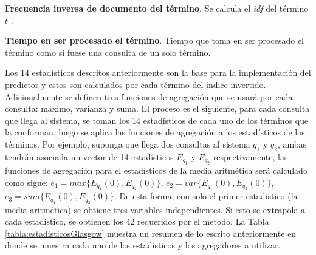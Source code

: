 \begin{list}{}{}
	\item \textbf{Frecuencia inversa de documento del término}. Se calcula el \textit{idf} del término $t$ \citep{Baeza-Yates:2011}.
	
	\item \textbf{Tiempo en ser procesado el término}. Tiempo que toma en ser procesado el término como si fuese una consulta de un solo término.

\end{list}

Los 14 estadísticos descritos anteriormente son la base para la implementación del predictor y estos son calculados por cada término del índice invertido. Adicionalmente se definen tres funciones de agregación que se usará por cada consulta: máximo, varianza y suma. El proceso es el siguiente, para cada consulta que llega al sistema, se toman los 14 estadísticos de cada uno de los términos que la conforman, luego se aplica las funciones de agregación a los estadísticos de los términos. Por ejemplo, suponga que llega dos consultas al sistema $q_1$ y $q_2$, ambas tendrán asociada un vector de 14 estadísticos $E_{q_1}$ y $E_{q_2}$ respectivamente, las funciones de agregación para el estadísticos de la media aritmética será calculado como sigue: $e_1 = max\{E_{q_1}(0), E_{q_2}(0)\}$, $e_2 = var\{E_{q_1}(0), E_{q_2}(0)\}$, $e_3 = sum\{E_{q_1}(0), E_{q_2}(0)\}$. De esta forma, con solo el primer estadistico (la media aritmética) se obtiene tres variables independientes. Si esto se extrapola a cada estadistico, se obtienen los 42 requeridos por el metodo. 
La Tabla \ref{tabla:estadisticosGlasgow} muestra un resumen de lo escrito anteriormente en donde se muestra cada uno de los estadísticos y los agregadores a utilizar. 

